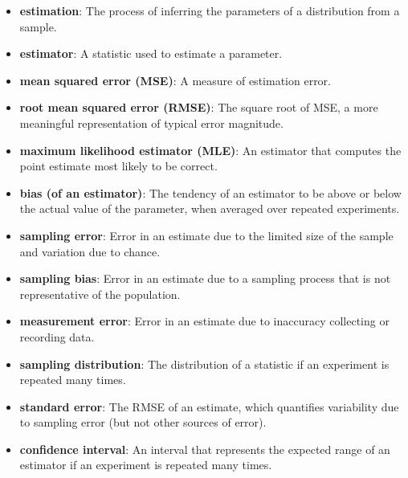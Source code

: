 \documentclass[12pt]{book}
\begin{document}
\begin{itemize}

\item {\bf estimation}: The process of inferring the parameters of a distribution
from a sample.

\item {\bf estimator}: A statistic used to estimate a parameter.

\item {\bf mean squared error (MSE)}: A measure of estimation error.

\item {\bf root mean squared error (RMSE)}: The square root of MSE,
a more meaningful representation of typical error magnitude.

\item {\bf maximum likelihood estimator (MLE)}: An estimator that computes the
point estimate most likely to be correct.

\item {\bf bias (of an estimator)}: The tendency of an estimator to be above or
  below the actual value of the parameter, when averaged over repeated
  experiments.  

\item {\bf sampling error}: Error in an estimate due to the limited
  size of the sample and variation due to chance. 

\item {\bf sampling bias}: Error in an estimate due to a sampling process
  that is not representative of the population. 

\item {\bf measurement error}: Error in an estimate due to inaccuracy collecting
  or recording data. 

\item {\bf sampling distribution}: The distribution of a statistic if an
  experiment is repeated many times.  

\item {\bf standard error}: The RMSE of an estimate,
which quantifies variability due to sampling error (but not
other sources of error).

\item {\bf confidence interval}: An interval that represents the expected
  range of an estimator if an experiment is repeated many times.
   

\end{itemize}
\end{document}
